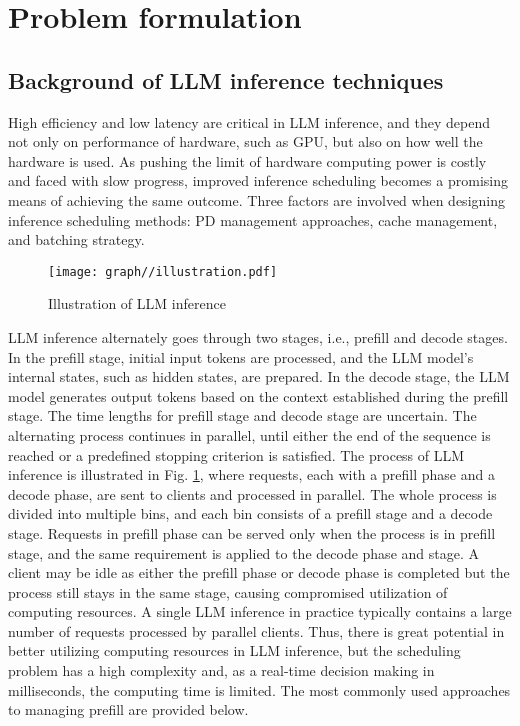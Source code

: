 \section{Problem formulation}
\label{problem_formulation}

\subsection{Background of LLM inference techniques}
High efficiency and low latency are critical in LLM inference, and they depend not only on performance of hardware, such as GPU, but also on how well the hardware is used. As pushing the limit of hardware computing power is costly and faced with slow progress, improved inference scheduling becomes a promising means of achieving the same outcome. Three factors are involved when designing inference scheduling methods: PD management approaches, cache management, and batching strategy.

\begin{figure}
    \centering
    \texttt{[image: graph//illustration.pdf]}
    \caption{Illustration of LLM inference}
    \label{fig:illustration}
\end{figure}

LLM inference alternately goes through two stages, i.e., prefill and decode stages. In the prefill stage, initial input tokens are processed, and the LLM model's internal states, such as hidden states, are prepared. In the decode stage, the LLM model generates output tokens based on the context established during the prefill stage. The time lengths for prefill stage and decode stage are uncertain. The alternating process continues in parallel, until either the end of the sequence is reached or a predefined stopping criterion is satisfied. The process of LLM inference is illustrated in Fig. \ref{fig:illustration}, where requests, each with a prefill phase and a decode phase, are sent to clients and processed in parallel. The whole process is divided into multiple bins, and each bin consists of a prefill stage and a decode stage. Requests in prefill phase can be served only when the process is in prefill stage, and the same requirement is applied to the decode phase and stage. A client may be idle as either the prefill phase or decode phase is completed but the process still stays in the same stage, causing compromised utilization of computing resources. A single LLM inference in practice typically contains a large number of requests processed by parallel clients. Thus, there is great potential in better utilizing computing resources in LLM inference, but the scheduling problem has a high complexity and, as a real-time decision making in milliseconds, the computing time is limited. The most commonly used approaches to managing prefill are provided below.

